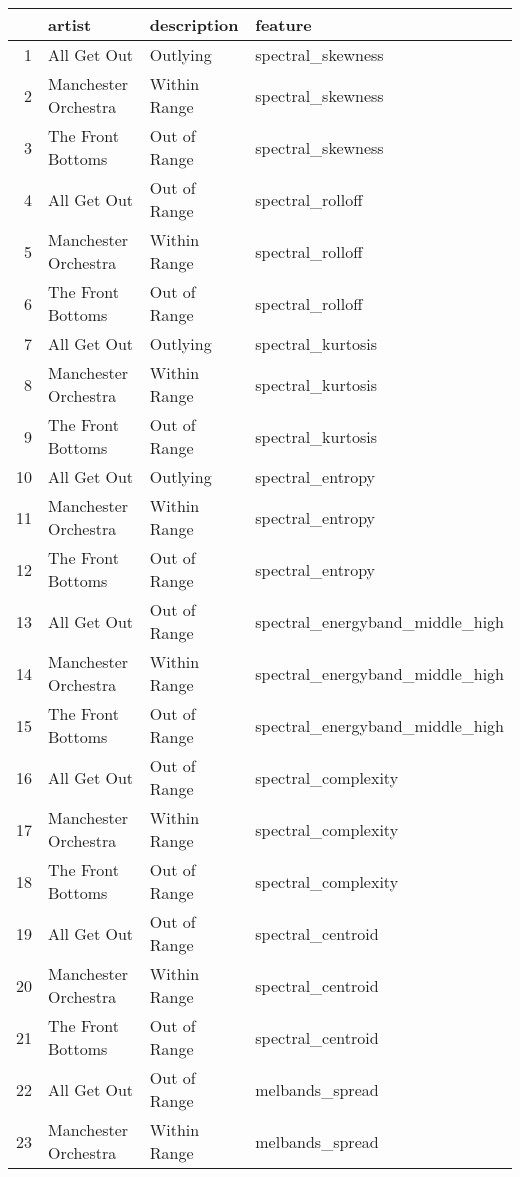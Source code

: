 \documentclass{article}\usepackage[]{graphicx}\usepackage[]{xcolor}
\begin{document}
\begin{table}[ht]
\centering
\begin{tabular}{rlll}
  \hline
 & artist & description & feature \\ 
  \hline
1 & All Get Out & Outlying & spectral\_skewness \\ 
  2 & Manchester Orchestra & Within Range & spectral\_skewness \\ 
  3 & The Front Bottoms & Out of Range & spectral\_skewness \\ 
  4 & All Get Out & Out of Range & spectral\_rolloff \\ 
  5 & Manchester Orchestra & Within Range & spectral\_rolloff \\ 
  6 & The Front Bottoms & Out of Range & spectral\_rolloff \\ 
  7 & All Get Out & Outlying & spectral\_kurtosis \\ 
  8 & Manchester Orchestra & Within Range & spectral\_kurtosis \\ 
  9 & The Front Bottoms & Out of Range & spectral\_kurtosis \\ 
  10 & All Get Out & Outlying & spectral\_entropy \\ 
  11 & Manchester Orchestra & Within Range & spectral\_entropy \\ 
  12 & The Front Bottoms & Out of Range & spectral\_entropy \\ 
  13 & All Get Out & Out of Range & spectral\_energyband\_middle\_high \\ 
  14 & Manchester Orchestra & Within Range & spectral\_energyband\_middle\_high \\ 
  15 & The Front Bottoms & Out of Range & spectral\_energyband\_middle\_high \\ 
  16 & All Get Out & Out of Range & spectral\_complexity \\ 
  17 & Manchester Orchestra & Within Range & spectral\_complexity \\ 
  18 & The Front Bottoms & Out of Range & spectral\_complexity \\ 
  19 & All Get Out & Out of Range & spectral\_centroid \\ 
  20 & Manchester Orchestra & Within Range & spectral\_centroid \\ 
  21 & The Front Bottoms & Out of Range & spectral\_centroid \\ 
  22 & All Get Out & Out of Range & melbands\_spread \\ 
  23 & Manchester Orchestra & Within Range & melbands\_spread \\ 

\end{tabular}
\end{table}
\end{document}
